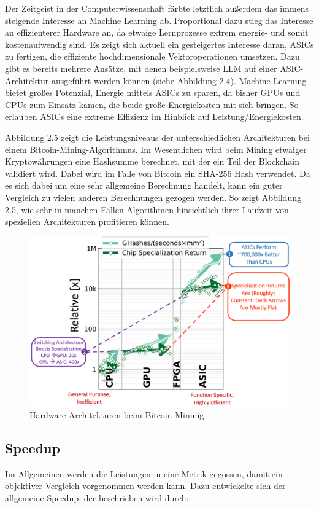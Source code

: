 Der Zeitgeist in der Computerwissenschaft färbte letztlich außerdem das immens steigende Interesse an Machine Learning ab. Proportional dazu stieg das Interesse an effizienterer Hardware an, da etwaige Lernprozesse extrem energie- und somit kostenaufwendig sind. Es zeigt sich aktuell ein gesteigertes Interesse daran, ASICs zu fertigen, die effiziente hochdimensionale Vektoroperationen umsetzen. Dazu gibt es bereits mehrere Ansätze, mit denen beispielsweise LLM auf einer ASIC-Architektur ausgeführt werden können (siehe Abbildung 2.4). Machine Learning bietet großes Potenzial, Energie mittels ASICs zu sparen, da bisher GPUs und CPUs zum Einsatz kamen, die beide große Energiekosten mit sich bringen. So erlauben ASICs eine extreme Effizienz im Hinblick auf Leistung/Energiekosten.

Abbildung 2.5 zeigt die Leistungsniveaus der unterschiedlichen Architekturen bei einem Bitcoin-Mining-Algorithmus. Im Wesentlichen wird beim Mining etwaiger Kryptowährungen eine Hashsumme berechnet, mit der ein Teil der Blockchain validiert wird. Dabei wird im Falle von Bitcoin ein SHA-256 Hash verwendet. Da es sich dabei um eine sehr allgemeine Berechnung handelt, kann ein guter Vergleich zu vielen anderen Berechnungen gezogen werden. So zeigt Abbildung 2.5, wie sehr in manchen Fällen Algorithmen hinsichtlich ihrer Laufzeit von speziellen Architekturen profitieren können.

\begin{figure}
    \centering
    \includegraphics[width=0.7\linewidth]{images/aisic.png}
    \caption{Hardware-Architekturen beim Bitcoin Mininig \cite{bitcoin}}
    \label{fig:enter-label}
\end{figure}
\subsection{Speedup}
Im Allgemeinen werden die Leistungen in eine Metrik gegossen, damit ein objektiver Vergleich vorgenommen werden kann. Dazu entwickelte sich der allgemeine Speedup, der beschrieben wird durch: \cite{speedup}

